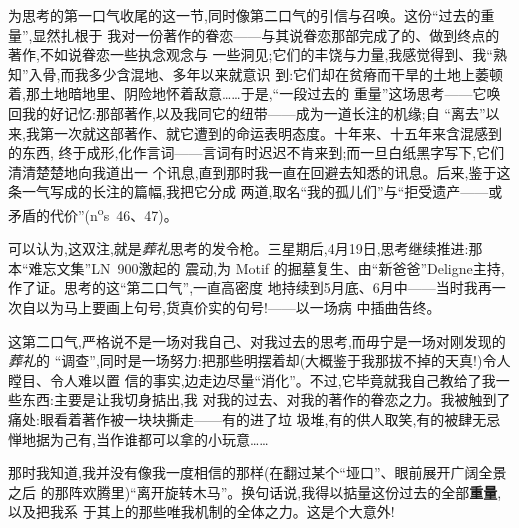 为思考的第一口气收尾的这一节,同时像第二口气的引信与召唤。这份“过去的重量”,显然扎根于
我对一份著作的眷恋——与其说眷恋那部完成了的、做到终点的著作,不如说眷恋一些执念观念与
一些洞见;它们的丰饶与力量,我感觉得到、我“熟知”入骨,而我多少含混地、多年以来就意识
到:它们却在贫瘠而干旱的土地上萎顿着,那土地暗地里、阴险地怀着敌意……于是,“一段过去的
重量”这场思考——它唤回我的好记忆:那部著作,以及我同它的纽带——成为一道长注的机缘;自
“离去”以来,我第一次就这部著作、就它遭到的命运表明态度。十年来、十五年来含混感到的东西,
终于成形,化作言词——言词有时迟迟不肯来到;而一旦白纸黑字写下,它们清清楚楚地向我道出一
个讯息,直到那时我一直在回避去知悉的讯息。后来,鉴于这条一气写成的长注的篇幅,我把它分成
两道,取名“我的孤儿们”与“拒受遗产——或矛盾的代价”(n\textsuperscript{o}s~46、47)。

\enlargethispage{2pt}
可以认为,这双注,就是\emph{葬礼}思考的发令枪。三星期后,4月19日,思考继续推进:那本“难忘文集”LN~900激起的
震动,为 Motif 的掘墓复生、由“新爸爸”Deligne主持,作了证。思考的这“第二口气”,一直高密度
地持续到5月底、6月中——当时我再一次自以为马上要画上句号,货真价实的句号!——以一场病\dmark{}
中插曲告终。

这第二口气,严格说不是一场对我自己、对我过去的思考,而毋宁是一场对刚发现的\emph{葬礼}的
“调查”,同时是一场努力:把那些明摆着却(大概鉴于我那拔不掉的天真!)令人瞠目、令人难以置
信的事实,边走边尽量“消化”。不过,它毕竟就我自己教给了我一些东西:主要是让我切身掂出,我
对我的过去、对我的著作的眷恋之力。我被触到了痛处:眼看着著作被一块块撕走——有的进了垃
圾堆,有的供人取笑,有的被肆无忌惮地据为己有,当作谁都可以拿的小玩意……

那时我知道,我并没有像我一度相信的那样(在翻过某个“垭口”、眼前展开广阔全景之后
的那阵欢腾里)“离开旋转木马”。换句话说,我得以掂量这份过去的全部\textbf{重量},以及把我系
于其上的那些唯我机制的全体之力。这是个大意外!

